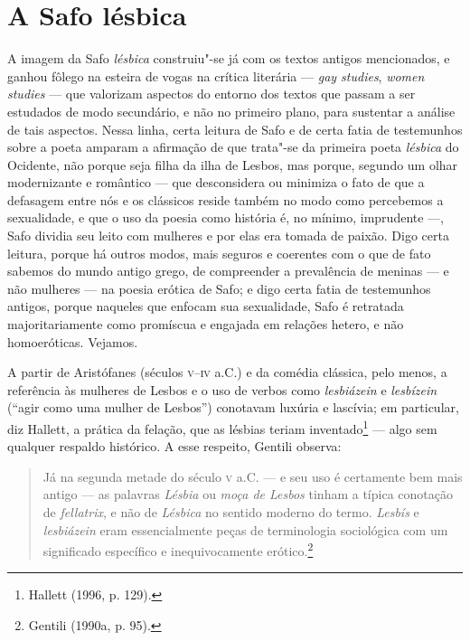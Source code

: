 \section{A Safo lésbica}


A imagem da Safo \textit{lésbica} construiu"-se já com os textos antigos mencionados, e ganhou fôlego
na esteira de vogas na crítica literária --- \textit{gay studies}, \textit{women
studies} --- que valorizam aspectos do entorno dos textos que passam a ser
estudados de modo secundário, e não no primeiro plano, para sustentar a análise
de tais aspectos. Nessa linha, certa leitura de Safo e de certa fatia de
testemunhos sobre a poeta amparam a afirmação de que trata"-se da primeira poeta
\textit{lésbica} do Ocidente, não porque seja filha da ilha de Lesbos, mas
porque, segundo um olhar modernizante e romântico --- que
desconsidera ou minimiza o fato de que a defasagem entre nós e os clássicos
reside também no modo como percebemos a sexualidade, e que o uso da poesia como
história é, no mínimo, imprudente ---, Safo dividia seu leito com mulheres e por
elas era tomada de paixão. Digo certa leitura, porque há outros modos, mais
seguros e coerentes com o que de fato sabemos do mundo antigo grego, de
compreender a prevalência de meninas --- e não mulheres ---  na poesia erótica de Safo; e digo
certa fatia de testemunhos antigos, porque naqueles que enfocam sua
sexualidade, Safo é retratada majoritariamente como promíscua e engajada em relações hetero, e não homoeróticas. Vejamos. 

A partir de Aristófanes (séculos \textsc{v}--\textsc{iv} a.C.) e da comédia clássica, pelo menos, a
referência às mulheres de Lesbos e o uso de verbos como \textit{lesbiázein} e
\textit{lesbízein} (“agir como uma mulher de Lesbos”) conotavam luxúria e
lascívia; em particular, diz Hallett, a prática da
felação, que as lésbias teriam inventado\footnote{ Hallett (1996, p. 129).} --- algo sem qualquer respaldo
histórico. A esse respeito, Gentili observa: 

\begin{quote}
Já na segunda metade do século \textsc{v} a.C. --- e seu uso é certamente bem mais antigo
--- as palavras \textit{Lésbia} ou \textit{moça de Lesbos} tinham a típica
conotação de \textit{fellatrix}, e não de \textit{Lésbica} no sentido moderno
do termo. \textit{Lesbís} e \textit{lesbiázein} eram essencialmente peças de
terminologia sociológica com um significado específico e inequivocamente
erótico.\footnote{ Gentili (1990a, p. 95).}
\end{quote}

